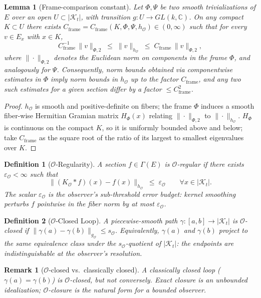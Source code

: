 \documentclass[11pt]{article}
\newtheorem{definition}{Definition}
\newtheorem{lemma}{Lemma}
\newtheorem{remark}{Remark}
\newcommand{\Kt}{\mathcal{K}_t}
\newcommand{\sO}{s_{\mathcal{O}}}  %
\newcommand{\Obs}{\mathcal{O}}
\newcommand{\Eps}{\varepsilon_{\Obs}}
\newcommand{\gO}{g_{\Obs}}
\newcommand{\hO}{h_{\Obs}}
\newcommand{\KO}{K_{\Obs}}
\newcommand{\EE}{E}
\newcommand{\Sect}{\Gamma}
\newcommand{\Cframe}{C_{\mathrm{frame}}}
\begin{document}
\begin{lemma}[Frame-comparison constant]
\label{lem:framecomp}
Let $\Phi, \Psi$ be two smooth trivializations of $\EE$ over an open
$U \subset |\Kt|$, with transition $g: U \to GL(k, \mathbb{C})$. On
any compact $K \subset U$ there exists
$\Cframe = \Cframe(K, \Phi, \Psi, \hO) \in (0, \infty)$ such that for
every $v \in \EE_x$ with $x \in K$,
\[
\Cframe^{-1}\, \|v\|_{\Phi, 2} \;\leq\; \|v\|_{\hO} \;\leq\; \Cframe\, \|v\|_{\Phi, 2},
\]
where $\|\cdot\|_{\Phi, 2}$ denotes the Euclidean norm on components
in the frame $\Phi$, and analogously for $\Psi$. Consequently, norm
bounds obtained via componentwise estimates in $\Phi$ imply norm
bounds in $\hO$ up to the factor $\Cframe$, and any two such
estimates for a given section differ by a factor $\leq \Cframe^2$.
\end{lemma}
\begin{proof}
$\hO$ is smooth and positive-definite on fibers; the frame $\Phi$
induces a smooth fiber-wise Hermitian Gramian matrix $H_\Phi(x)$
relating $\|\cdot\|_{\Phi, 2}$ to $\|\cdot\|_{\hO}$. $H_\Phi$ is
continuous on the compact $K$, so it is uniformly bounded above and
below; take $\Cframe$ as the square root of the ratio of its largest
to smallest eigenvalues over $K$.
\end{proof}

\begin{definition}[$\Obs$-Regularity]
\label{def:oreg}
A section $f \in \Sect(\EE)$ is \emph{$\Obs$-regular} if there exists
$\Eps < \infty$ such that
\[
\|(\KO * f)(x) - f(x)\|_{\hO} \;\leq\; \Eps \qquad \forall x \in |\Kt|.
\]
The scalar $\Eps$ is the observer's sub-threshold error budget:
kernel smoothing perturbs $f$ pointwise in the fiber norm by at most
$\Eps$.
\end{definition}

\begin{definition}[$\Obs$-Closed Loop]
\label{def:oclosed}
A piecewise-smooth path $\gamma: [a, b] \to |\Kt|$ is
\emph{$\Obs$-closed} if $\|\gamma(a) - \gamma(b)\|_{\gO} \leq \sO$.
Equivalently, $\gamma(a)$ and $\gamma(b)$ project to the same
equivalence class under the $\sO$-quotient of $|\Kt|$: the
endpoints are indistinguishable at the observer's resolution.
\end{definition}

\begin{remark}[$\Obs$-closed vs.\ classically closed]
\label{rem:oclosed-vs-classical}
A classically closed loop ($\gamma(a) = \gamma(b)$) is $\Obs$-closed,
but not conversely. Exact closure is an unbounded idealization;
$\Obs$-closure is the natural form for a bounded observer.
\end{remark}
\end{document}
